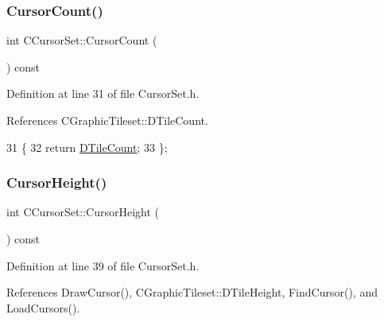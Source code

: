 \subsubsection{\texorpdfstring{Cursor\+Count()}{CursorCount()}}
{\footnotesize\ttfamily int C\+Cursor\+Set\+::\+Cursor\+Count (\begin{DoxyParamCaption}{ }\end{DoxyParamCaption}) const\hspace{0.3cm}{\ttfamily [inline]}}



Definition at line 31 of file Cursor\+Set.\+h.



References C\+Graphic\+Tileset\+::\+D\+Tile\+Count.


\begin{DoxyCode}
31                                \{
32             \textcolor{keywordflow}{return} \hyperlink{classCGraphicTileset_a39d942b370e47f441bf97385eb1037c8}{DTileCount};
33         \};
\end{DoxyCode}
\hypertarget{classCCursorSet_a25ce1f3e861c3d4ea701bb2e810728a6}{}\label{classCCursorSet_a25ce1f3e861c3d4ea701bb2e810728a6} 
\subsubsection{\texorpdfstring{Cursor\+Height()}{CursorHeight()}}
{\footnotesize\ttfamily int C\+Cursor\+Set\+::\+Cursor\+Height (\begin{DoxyParamCaption}{ }\end{DoxyParamCaption}) const\hspace{0.3cm}{\ttfamily [inline]}}



Definition at line 39 of file Cursor\+Set.\+h.



References Draw\+Cursor(), C\+Graphic\+Tileset\+::\+D\+Tile\+Height, Find\+Cursor(), and Load\+Cursors().


